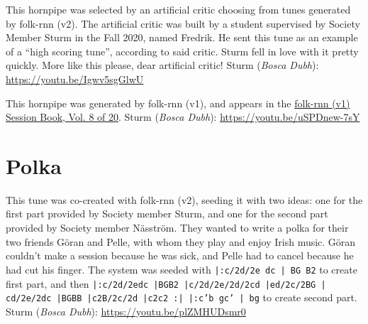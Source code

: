 \documentclass[a4paper,notitlepage,twoside]{book}
\begin{document}
{}  
\hypertarget{hornpipe:FredriksChristmasCritic}{}
This hornpipe was selected by an artificial critic choosing from tunes generated by folk-rnn (v2). The artificial critic was built by a student supervised by Society Member Sturm in the Fall 2020, named Fredrik. He sent  this tune as an example of a ``high scoring tune'', according to said critic. Sturm fell in love with it pretty quickly. More like this please, dear artificial critic! Sturm ({\em Bosca Dubh}): \url{https://youtu.be/Igwv5sgGlwU}

{}  
  
\hypertarget{hornpipe:SorpikesCat}{}
This hornpipe was generated by folk-rnn (v1), and
appears in the \href{https://highnoongmt.wordpress.com/2018/01/05/volumes-1-20-of-folk-rnn-v1-transcriptions}{folk-rnn (v1) Session Book, Vol. 8 of 20}.
Sturm ({\em Bosca Dubh}): \url{https://youtu.be/uSPDnew-7sY}

\clearpage
\section{Polka}
{}  
 
\hypertarget{polka:GoranPelle}{}
This tune was co-created with folk-rnn (v2), seeding it with two ideas: 
one for the first part provided by Society member Sturm, 
and one for the second part provided by Society member Näsström. 
They wanted to write a polka for their two friends Göran and Pelle, 
with whom they play and enjoy Irish music. 
Göran couldn't make a session because he was sick, 
and Pelle had to cancel because he had cut his finger.
The system was seeded with {\tt |:c/2d/2e dc | BG B2} to create first part,
and then 
{\tt |:c/2d/2edc |BGB2 |c/2d/2e/2d/2cd |ed/2c/2BG | cd/2e/2dc |BGBB |c2B/2c/2d |c2c2 :| |:c'b gc' | bg}
to create second part.
Sturm ({\em Bosca Dubh}): \url{https://youtu.be/plZMHUDsmr0}
\end{document}
